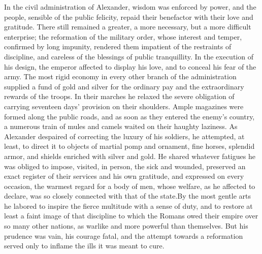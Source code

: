 In the civil administration of Alexander, wisdom was enforced by
power, and the people, sensible of the public felicity, repaid
their benefactor with their love and gratitude. There still
remained a greater, a more necessary, but a more difficult
enterprise; the reformation of the military order, whose interest
and temper, confirmed by long impunity, rendered them impatient
of the restraints of discipline, and careless of the blessings of
public tranquillity. In the execution of his design, the emperor
affected to display his love, and to conceal his fear of the
army. The most rigid economy in every other branch of the
administration supplied a fund of gold and silver for the
ordinary pay and the extraordinary rewards of the troops. In
their marches he relaxed the severe obligation of carrying
seventeen days’ provision on their shoulders. Ample magazines
were formed along the public roads, and as soon as they entered
the enemy’s country, a numerous train of mules and camels waited
on their haughty laziness. As Alexander despaired of correcting
the luxury of his soldiers, he attempted, at least, to direct it
to objects of martial pomp and ornament, fine horses, splendid
armor, and shields enriched with silver and gold. He shared
whatever fatigues he was obliged to impose, visited, in person,
the sick and wounded, preserved an exact register of their
services and his own gratitude, and expressed on every occasion,
the warmest regard for a body of men, whose welfare, as he
affected to declare, was so closely connected with that of the
state.\footnotemark[73] By the most gentle arts he labored to inspire the
fierce multitude with a sense of duty, and to restore at least a
faint image of that discipline to which the Romans owed their
empire over so many other nations, as warlike and more powerful
than themselves. But his prudence was vain, his courage fatal,
and the attempt towards a reformation served only to inflame the
ills it was meant to cure.


